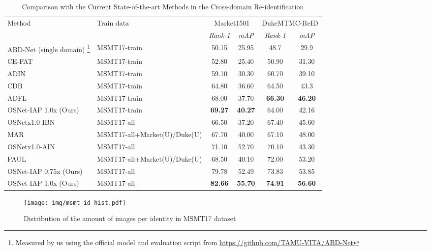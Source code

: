 \documentclass[a4paper,conference]{IEEEtran}
\begin{document}
\begin{table*}
\caption{Comparison with the Current State-of-the-art Methods in the Cross-domain Re-identification}
\label{tab:sota}
  \begin{minipage}[c]{\hsize}
  \centering
  \begin{tabular}{l|l|cc|cc}
    \hline
    Method & Train data & \multicolumn{2}{c}{Market1501} & \multicolumn{2}{|c}{DukeMTMC-ReID}   \\
     & & \textit{Rank-1} & \textit{mAP}  & \textit{Rank-1} & \textit{mAP}  \\
    \hline
    ABD-Net \cite{abd} (single domain) \footnote{Measured by us using the official
    model and evaluation script from \url{https://github.com/TAMU-VITA/ABD-Net}}
    & MSMT17-train & 50.15 & 25.95 & 48.7 & 29.9 \\
    \hline
    CE-FAT \cite{inDefenceTriplet2} & MSMT17-train & 52.80 & 25.40 & 50.90 & 31.30 \\
    ADIN \cite{yuan2019calibrated} & MSMT17-train & 59.10 & 30.30 & 60.70 & 39.10 \\
    CDB \cite{baselineCrossDomain} & MSMT17-train & 64.80 & 36.60 & 64.50 & 43.3 \\
    ADFL \cite{Liu2019AttentionAB} & MSMT17-train & 68.00 & 37.70 & \textbf{66.30} & \textbf{46.20} \\
    \hline
    OSNet-IAP 1.0x (Ours) & MSMT17-train & \textbf{69.27} & \textbf{40.27} & 64.00 & 42.16 \\
    \hline
    \hline
    OSNetx1.0-IBN \cite{zhou2019osnet} & MSMT17-all & 66.50 & 37.20 & 67.40 & 45.60 \\
    MAR \cite{Yu2019UnsupervisedPR} & MSMT17-all+Market(U)/Duke(U) & 67.70 & 40.00 & 67.10 & 48.00 \\
    OSNetx1.0-AIN \cite{zhou2019learning} & MSMT17-all & 71.10 & 52.70 & 70.10 & 43.30 \\
    PAUL \cite{Yang2019PatchBasedDF} & MSMT17-all+Market(U)/Duke(U) & 68.50 & 40.10 & 72.00 & 53.20 \\
    \hline
    OSNet-IAP 0.75x (Ours) & MSMT17-all & 79.78 & 52.49 & 73.83 & 53.85 \\
    OSNet-IAP 1.0x (Ours) & MSMT17-all & \textbf{82.66} & \textbf{55.70} & \textbf{74.91} & \textbf{56.60} \\
    \hline
  \end{tabular}
  \end{minipage}
\end{table*}

\begin{figure}[ht]
  \begin{center}
    \texttt{[image: img/msmt\_id\_hist.pdf]}
  \end{center}
  \caption{Distribution of the amount of images per identity in MSMT17 dataset}
  \label{fig:msmt_hist}
\end{figure}
\end{document}
